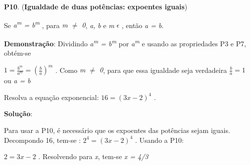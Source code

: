 \textbf{P10}. (\textbf{Igualdade de duas potências: expoentes iguais})

 Se \textit{a\textsuperscript{m} = b\textsuperscript{m}} , para \textit{m $ \neq $  0}, \textit{a,} \textit{b} e \textit{m} $ \epsilon $  , então \textit{a = b}.

\textbf{Demonstração}: Dividindo \textit{a\textsuperscript{m} = b\textsuperscript{m}} por \textit{ a\textsuperscript{m}  }e usando as propriedades P3 e P7, obtém-se

  \( 1=\frac{b^{m}}{a^{m}}=  \left( \frac{b}{a} \right) ^{m} \) . Como \textit{m $ \neq $  0}, para que essa igualdade seja verdadeira  \( \frac{b}{a}=1 \) ou  \textit{a = b} \qedsymbol{}

\begin{texemplo}
Resolva a equação exponencial:   \( 16= \left( 3x-2 \right) ^{4} \) .

\textbf{Solução}: 

 Para usar a P10, é necessário que os expoentes das potências sejam iguais.  Decompondo 16, tem-se :  \( 2^{4}= \left( 3x-2 \right) ^{4} \) . Usando a P10:

  \( 2=3x-2  \) . Resolvendo para \textit{x}, tem-se \textit{x = 4/3} \qedsymbol{}
\end{texemplo}

